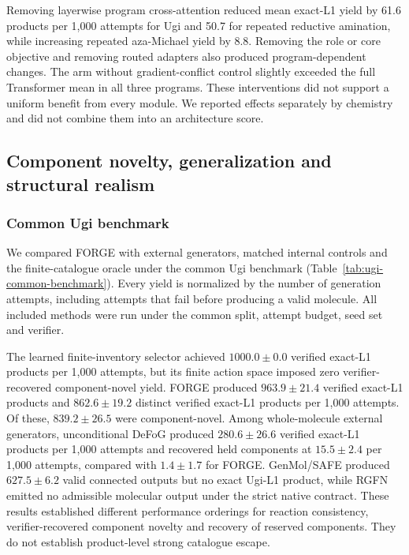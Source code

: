 \documentclass{article}
\theoremstyle{definition}
\newcommand{\ForgeProseCommonDefogExactPerThousand}{$280.6\pm26.6$}
\newcommand{\ForgeProseCommonDefogHeldPerThousand}{$15.5\pm2.4$}
\newcommand{\ForgeProseCommonForgeComponentNovelPerThousand}{$839.2\pm26.5$}
\newcommand{\ForgeProseCommonForgeDistinctPerThousand}{$862.6\pm19.2$}
\newcommand{\ForgeProseCommonForgeExactPerThousand}{$963.9\pm21.4$}
\newcommand{\ForgeProseCommonForgeHeldPerThousand}{$1.4\pm1.7$}
\newcommand{\ForgeProseCommonGenmolValidPerThousand}{$627.5\pm6.2$}
\newcommand{\ForgeProseCommonSelectorExactPerThousand}{$1000.0\pm0.0$}
\newcommand{\ForgeProseNoCrossAttentionBLIncrease}{8.8}
\newcommand{\ForgeProseNoCrossAttentionLXReduction}{50.7}
\newcommand{\ForgeProseNoCrossAttentionUgiReduction}{61.6}
\begin{document}
Removing layerwise program cross-attention reduced mean exact-L1 yield by
\ForgeProseNoCrossAttentionUgiReduction{} products per 1,000 attempts for Ugi and
\ForgeProseNoCrossAttentionLXReduction{} for repeated reductive amination, while increasing repeated
aza-Michael yield by \ForgeProseNoCrossAttentionBLIncrease{}. Removing the role or core objective and
removing routed adapters also produced
program-dependent changes. The arm without gradient-conflict control slightly exceeded the full
Transformer mean in all three programs. These interventions did not support a uniform benefit
from every module. We reported effects separately by chemistry and did not combine them into an
architecture score.

\FloatBarrier
\subsection{Component novelty, generalization and structural realism}
\label{app:novelty-results}

\subsubsection{Common Ugi benchmark}

\label{app:reporting}

We compared FORGE with external generators, matched internal controls and the finite-catalogue
oracle under the common Ugi benchmark (Table~\ref{tab:ugi-common-benchmark}).
Every yield is normalized by the number of generation attempts, including attempts that fail before
producing a valid molecule.
All included methods were run under the common split, attempt budget, seed set and verifier.



The learned finite-inventory selector achieved \ForgeProseCommonSelectorExactPerThousand{} verified
exact-L1 products per 1,000
attempts, but its finite action space imposed zero verifier-recovered component-novel yield. FORGE
produced \ForgeProseCommonForgeExactPerThousand{} verified exact-L1 products and
\ForgeProseCommonForgeDistinctPerThousand{} distinct verified exact-L1 products per 1,000 attempts.
Of these, \ForgeProseCommonForgeComponentNovelPerThousand{} were component-novel.
Among whole-molecule external generators, unconditional DeFoG produced
\ForgeProseCommonDefogExactPerThousand{} verified exact-L1 products per 1,000 attempts and recovered
held components at \ForgeProseCommonDefogHeldPerThousand{} per 1,000 attempts, compared with
\ForgeProseCommonForgeHeldPerThousand{} for FORGE. GenMol/SAFE produced
\ForgeProseCommonGenmolValidPerThousand{} valid connected outputs but no exact Ugi-L1 product, while
RGFN emitted no admissible
molecular output under the strict native contract. These results established different performance orderings for
reaction consistency, verifier-recovered component novelty and recovery of reserved components. They do not establish product-level strong catalogue escape.
\end{document}
